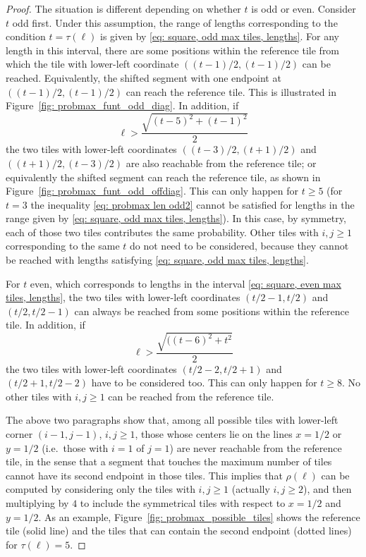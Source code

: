 \documentclass[12pt, a4paper]{article}
\newcommand{\funt}{\tau} %
\newcommand{\probmax}{\rho} %
\newcommand{\len}{\ell} %
\newcommand{\tiles}{t} %
\begin{document}
\begin{proof}
The situation is different depending on whether $\tiles$ is odd or even. Consider $\tiles$ odd first. Under this assumption, the range of lengths corresponding to the condition $\tiles = \funt(\len)$ is given by \eqref{eq: square, odd max tiles, lengths}. For any length in this interval, there are some positions within the reference tile from which the tile with lower-left coordinate $((\tiles-1)/2, (\tiles-1)/2)$ can be reached. Equivalently, the shifted segment with one endpoint at $((\tiles-1)/2, (\tiles-1)/2)$ can reach the reference tile. This is illustrated in Figure~\ref{fig: probmax_funt_odd_diag}. In addition, if 
\begin{equation}
\label{eq: probmax len odd2}
\len > \frac{\sqrt{(\tiles-5)^2 + (\tiles-1)^2}}{2}
\end{equation}
the two tiles with lower-left coordinates $((\tiles-3)/2, (\tiles+1)/2)$ and $((\tiles+1)/2, (\tiles-3)/2)$ are also reachable from the reference tile; or equivalently the shifted segment can reach the reference tile, as shown in Figure~\ref{fig: probmax_funt_odd_offdiag}. This can only happen for $\tiles \geq 5$ (for $\tiles=3$ the inequality \eqref{eq: probmax len odd2} cannot be satisfied for lengths in the range given by \eqref{eq: square, odd max tiles, lengths}). In this case, by symmetry, each of those two tiles contributes the same probability. Other tiles with $i,j\geq 1$ corresponding to the same $\tiles$ do not need to be considered, because they cannot be reached with lengths satisfying \eqref{eq: square, odd max tiles, lengths}.

For $\tiles$ even, which corresponds to lengths in the interval \eqref{eq: square, even max tiles, lengths}, the two tiles with lower-left coordinates $(\tiles/2-1, \tiles/2)$ and $(\tiles/2, \tiles/2-1)$ can always be reached from some positions within the reference tile. In addition, if
\begin{equation}
\label{eq: probmax len even2}
\len > \frac{\sqrt{((\tiles-6)^2 + \tiles^2}}{2}
\end{equation}
the two tiles with lower-left coordinates $(\tiles/2-2, \tiles/2+1)$ and $(\tiles/2+1, \tiles/2-2)$ have to be considered too. This can only happen for $\tiles \geq 8$. No other tiles with $i,j\geq 1$ can be reached from the reference tile.

The above two paragraphs show that, among all possible tiles with lower-left corner $(i-1,j-1)$, $i,j\geq 1$, those whose centers lie on the lines $x=1/2$ or $y=1/2$ (i.e.~those with $i=1$ of $j=1$) are never reachable from the reference tile, in the sense that a segment that touches the maximum number of tiles cannot have its second endpoint in those tiles. This implies that $\probmax(\len)$ can be computed by considering only the tiles with $i,j\geq 1$ (actually $i,j \geq 2$), and then multiplying by $4$ to include the symmetrical tiles with respect to $x=1/2$ and $y=1/2$. As an example, Figure~\ref{fig: probmax_possible_tiles} shows the reference tile (solid line) and the tiles that can contain the second endpoint (dotted lines) for $\funt(\len) = 5$.


\end{proof}
\end{document}
